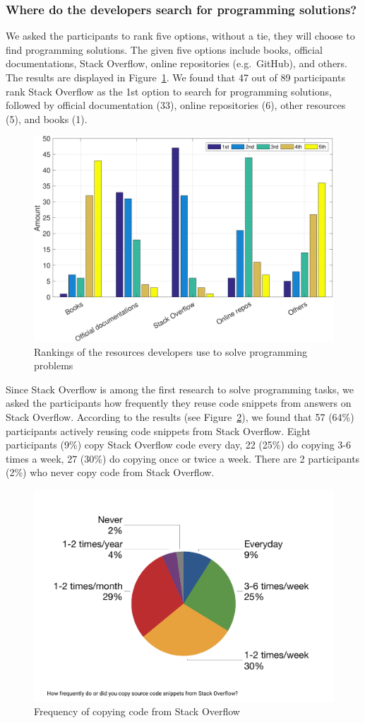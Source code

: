 \documentclass{svjour3}                     %
\begin{document}
\subsubsection*{Where do the developers search for programming solutions?}

We asked the participants to rank five options, without a tie, they will choose
to find programming solutions. The given five options include books, official
documentations, Stack Overflow, online repositories (e.g.\ GitHub), and others.
The results are displayed in Figure~\ref{fig:survey_visitor_rankings-crop}. We
found that 47 out of 89 participants rank Stack Overflow as the 1st option to
search for programming solutions, followed by official documentation (33),
online repositories (6), other resources (5), and books (1).

\begin{figure} \centering
	\includegraphics[width=.5\linewidth]{survey_visitor_rankings-crop} 
	\caption{Rankings of the resources developers use to solve programming problems}
	\label{fig:survey_visitor_rankings-crop} 
\end{figure}

Since Stack Overflow is among the first research to solve programming tasks, we
asked the participants how frequently they reuse code snippets from answers on
Stack Overflow. According to the results (see
Figure~\ref{fig:survey_visitor_frequency_so_copy-crop}), we found that 57 (64\%)
participants actively reusing code snippets from Stack Overflow. Eight
participants (9\%) copy Stack Overflow code every day, 22 (25\%) do copying 3-6
times a week, 27 (30\%) do copying once or twice a week. There are 2
participants (2\%) who never copy code from Stack Overflow.

\begin{figure} \centering
	\includegraphics[width=.5\linewidth]{survey_visitor_frequency_so_copy} 
	\caption{Frequency of copying code from Stack Overflow}
	\label{fig:survey_visitor_frequency_so_copy-crop} 
\end{figure}
\end{document}
